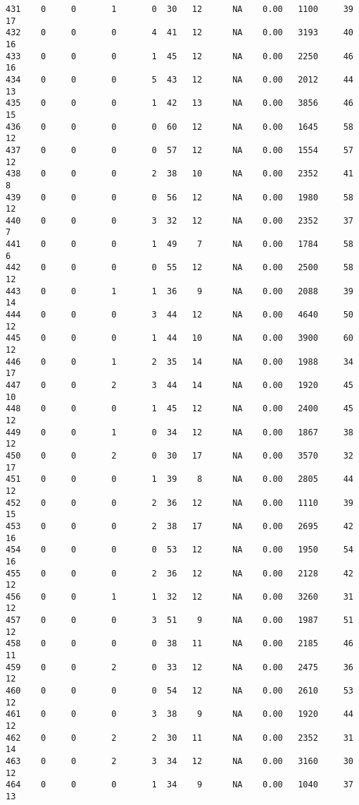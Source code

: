 \documentclass[
  letterpaper,
  DIV=11,
  numbers=noendperiod]{scrreprt}
\begin{document}
\begin{verbatim}
431    0     0       1       0  30   12      NA    0.00   1100     39      17
432    0     0       0       4  41   12      NA    0.00   3193     40      16
433    0     0       0       1  45   12      NA    0.00   2250     46      16
434    0     0       0       5  43   12      NA    0.00   2012     44      13
435    0     0       0       1  42   13      NA    0.00   3856     46      15
436    0     0       0       0  60   12      NA    0.00   1645     58      12
437    0     0       0       0  57   12      NA    0.00   1554     57      12
438    0     0       0       2  38   10      NA    0.00   2352     41       8
439    0     0       0       0  56   12      NA    0.00   1980     58      12
440    0     0       0       3  32   12      NA    0.00   2352     37       7
441    0     0       0       1  49    7      NA    0.00   1784     58       6
442    0     0       0       0  55   12      NA    0.00   2500     58      12
443    0     0       1       1  36    9      NA    0.00   2088     39      14
444    0     0       0       3  44   12      NA    0.00   4640     50      12
445    0     0       0       1  44   10      NA    0.00   3900     60      12
446    0     0       1       2  35   14      NA    0.00   1988     34      17
447    0     0       2       3  44   14      NA    0.00   1920     45      10
448    0     0       0       1  45   12      NA    0.00   2400     45      12
449    0     0       1       0  34   12      NA    0.00   1867     38      12
450    0     0       2       0  30   17      NA    0.00   3570     32      17
451    0     0       0       1  39    8      NA    0.00   2805     44      12
452    0     0       0       2  36   12      NA    0.00   1110     39      15
453    0     0       0       2  38   17      NA    0.00   2695     42      16
454    0     0       0       0  53   12      NA    0.00   1950     54      16
455    0     0       0       2  36   12      NA    0.00   2128     42      12
456    0     0       1       1  32   12      NA    0.00   3260     31      12
457    0     0       0       3  51    9      NA    0.00   1987     51      12
458    0     0       0       0  38   11      NA    0.00   2185     46      11
459    0     0       2       0  33   12      NA    0.00   2475     36      12
460    0     0       0       0  54   12      NA    0.00   2610     53      12
461    0     0       0       3  38    9      NA    0.00   1920     44      12
462    0     0       2       2  30   11      NA    0.00   2352     31      14
463    0     0       2       3  34   12      NA    0.00   3160     30      12
464    0     0       0       1  34    9      NA    0.00   1040     37      13

\end{verbatim}
\end{document}
